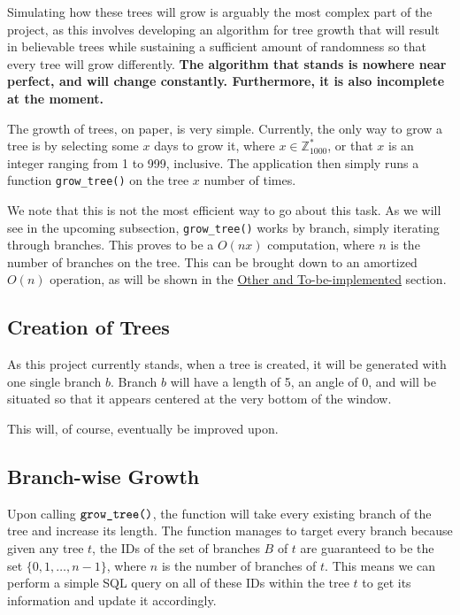 Simulating how these trees will grow is arguably the most complex part of the project, as this involves developing an algorithm for tree growth that will result in believable trees while sustaining a sufficient amount of randomness so that every tree will grow differently. \textbf{The algorithm that stands is nowhere near perfect, and will change constantly. Furthermore, it is also incomplete at the moment.}

The growth of trees, on paper, is very simple. Currently, the only way to grow a tree is by selecting some $x$ days to grow it, where $x \in \mathbb{Z}_{1000}^*$, or that $x$ is an integer ranging from 1 to 999, inclusive. The application then simply runs a function \verb|grow_tree()| on the tree $x$ number of times.

We note that this is not the most efficient way to go about this task. As we will see in the upcoming subsection, \verb|grow_tree()| works by branch, simply iterating through branches. This proves to be a $O(nx)$ computation, where $n$ is the number of branches on the tree. This can be brought down to an amortized $O(n)$ operation, as will be shown in the \hyperlink{others}{Other and To-be-implemented} section.

\subsection{Creation of Trees}

As this project currently stands, when a tree is created, it will be generated with one single branch $b$. Branch $b$ will have a length of 5, an angle of 0, and will be situated so that it appears centered at the very bottom of the window.

This will, of course, eventually be improved upon.

\subsection{Branch-wise Growth}

Upon calling $\verb|grow_tree()|$, the function will take every existing branch of the tree and increase its length. The function manages to target every branch because given any tree $t$, the IDs of the set of branches $B$ of $t$ are guaranteed to be the set $\{0,1,\dots,n-1\}$, where $n$ is the number of branches of $t$. This means we can perform a simple SQL query on all of these IDs within the tree $t$ to get its information and update it accordingly.

